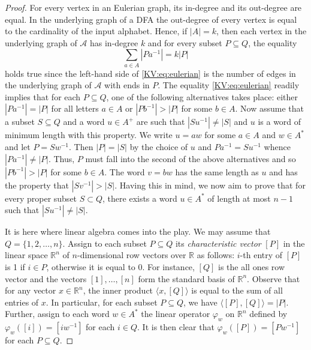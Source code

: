 \documentclass{irmaart}
\theoremstyle{plain}
\begin{document}
\begin{proof}
For every vertex in an Eulerian graph, its in-degree and its out-degree are
equal. In the underlying graph of a DFA the out-degree of every vertex is equal
to the cardinality of the input alphabet. Hence, if $|A|=k$, then each vertex
in the underlying graph of $\mathcal{A}$ has in-degree $k$ and for every subset
$P\subseteq Q$, the equality
\begin{equation}
\label{KV:eq:eulerian} \sum_{a\in A}|Pa^{-1}|=k|P|
\end{equation}
holds true since the left-hand side of \eqref{KV:eq:eulerian} is the number of
edges in the underlying graph of $\mathcal{A}$ with ends in $P$. The equality
\eqref{KV:eq:eulerian} readily implies that for each $P\subseteq Q$, one of the
following alternatives takes place: either $|Pa^{-1}|=|P|$ for all letters
$a\in A$ or $|Pb^{-1}|>|P|$ for some $b\in A$. Now assume that a subset
$S\subseteq Q$ and a word $u\in A^+$ are such that $|Su^{-1}|\ne|S|$ and $u$ is
a word of minimum length with this property. We write $u=aw$ for some $a\in A$
and $w\in A^*$ and let $P=Sw^{-1}$. Then $|P|=|S|$ by the choice of $u$ and
$Pa^{-1}=Su^{-1}$ whence $|Pa^{-1}|\ne|P|$. Thus, $P$ must fall into the second
of the above alternatives and so $|Pb^{-1}|>|P|$ for some $b\in A$. The word
$v=bw$ has the same length as $u$ and has the property that $|Sv^{-1}|>|S|$.
Having this in mind, we now aim to prove that for every proper subset $S\subset
Q$, there exists a word $u\in A^*$ of length at most $n-1$ such that
$|Su^{-1}|\ne|S|$.

It is here where linear algebra comes into the play. We may assume that
$Q=\{1,2,\dots,n\}$. Assign to each subset $P\subseteq Q$ its
\emph{characteristic vector} $[P]$ in the linear
space $\mathbb{R}^n$ of $n$-dimensional row vectors over $\mathbb{R}$ as
follows: $i$-th entry of $[P]$ is 1 if $i\in P$, otherwise it is equal to 0.
For instance, $[Q]$ is the all ones row vector and the vectors $[1],\dots,[n]$
form the standard basis of $\mathbb{R}^n$. Observe that for any vector
$x\in\mathbb{R}^n$, the inner product $\langle x,[Q]\rangle$ is equal to the
sum of all entries of $x$. In particular, for each subset $P\subseteq Q$, we
have $\langle[P],[Q]\rangle=|P|$. Further, assign to each word $w\in A^*$ the
linear operator $\varphi_w$ on $\mathbb{R}^n$ defined by
$\varphi_w([i])=[iw^{-1}]$ for each $i\in Q$. It is then clear that
$\varphi_w([P])=[Pw^{-1}]$ for each $P\subseteq Q$.


\end{proof}
\end{document}
